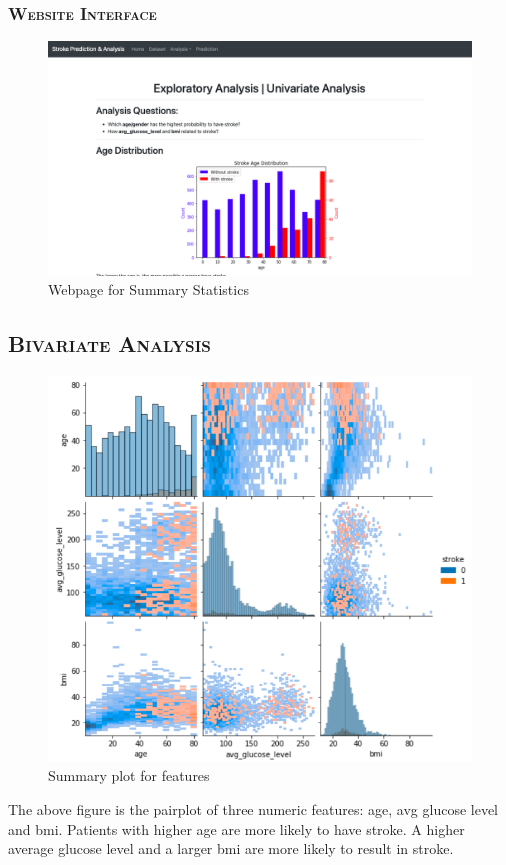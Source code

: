 \documentclass[a4paper,12pt]{article}
\begin{document}
\subsubsection{\textsc{Website Interface}}
\begin{figure}[h] 
    \centering
    \includegraphics[width=1\textwidth]{home_p7} 
    \caption{Webpage for Summary Statistics} 
\end{figure}

\newpage
\subsection{\textsc{Bivariate Analysis}}
\begin{figure}[h] 
    \centering
    \includegraphics[width=.8\textwidth]{biv_p2} 
    \caption{Summary plot for features} 
\end{figure}
The above figure is the pairplot of three numeric features: age, avg glucose level and bmi. 
Patients with higher age are more likely to have stroke. 
A higher average glucose level and a larger bmi are more likely to result in stroke.
\end{document}
